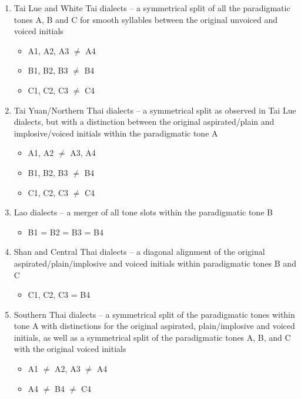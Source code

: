 \documentclass[output=paper]{langscibook}
\begin{document}
\begin{enumerate}
\item Tai Lue and White Tai dialects – a symmetrical split of all the paradigmatic tones A, B and C for smooth syllables between the original unvoiced and voiced initials
      \begin{itemize}[label=→]
        \item A1, A2, A3 ${\neq}$ A4
        \item B1, B2, B3 ${\neq}$ B4
        \item C1, C2, C3 ${\neq}$ C4
      \end{itemize}
  
\item Tai Yuan\slash Northern Thai dialects – a symmetrical split as observed in Tai Lue dialects, but with a distinction between the original aspirated/plain and implosive/voiced initials within the paradigmatic tone A
      \begin{itemize}[label=→]
        \item A1, A2 ${\neq}$ A3, A4
        \item B1, B2, B3 ${\neq}$ B4
        \item C1, C2, C3 ${\neq}$ C4
      \end{itemize}
      
\item Lao dialects – a merger of all tone slots within the paradigmatic tone B
      \begin{itemize}[label=→]
        \item B1 = B2 = B3 = B4
      \end{itemize}

\item Shan and Central Thai dialects – a diagonal alignment of the original aspirated/plain/implosive and voiced initials within paradigmatic tones B and C
      \begin{itemize}[label=→]
        \item  C1, C2, C3 = B4
      \end{itemize}

\item Southern Thai dialects – a symmetrical split of the paradigmatic tones within tone A with distinctions for the original aspirated, plain/implosive and voiced initials, as well as a symmetrical split of the paradigmatic tones A, B, and C with the original voiced initials
      \begin{itemize}[label=→]
        \item A1 ${\neq}$ A2, A3 ${\neq}$ A4
        \item A4 ${\neq}$ B4 ${\neq}$ C4
      \end{itemize}
\end{enumerate}
\end{document}
